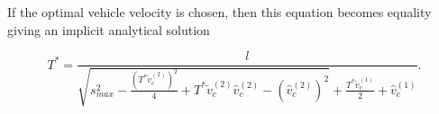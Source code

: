 \documentclass[pdflatex,sn-mathphys-num]{sn-jnl}%
\theoremstyle{thmstyleone}%
\theoremstyle{thmstyletwo}%
\theoremstyle{thmstylethree}%
\begin{document}
If the optimal vehicle velocity is chosen, then this equation becomes equality giving an implicit analytical solution

\begin{equation}
    T^* = \frac{l}{\sqrt{s_{max}^2 - \frac{\left(T^* \tilde{v}_c^{(2)}\right)^2}{4} + T^* \tilde{v}_c^{(2)} \hat{v}_c^{(2)} - \left(\hat{v}_c^{(2)}\right)^2 } + \frac{T^* \tilde{v}_c^{(1)}}{2} + \hat{v}_c^{(1)}}.
\end{equation}











\end{document}
